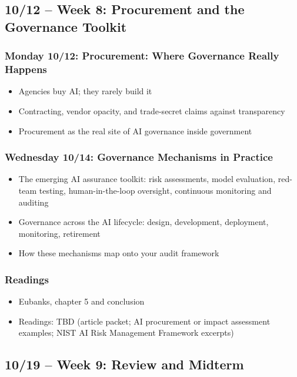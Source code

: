 \documentclass[12pt]{article}
\begin{document}
\subsection*{10/12 -- Week 8: Procurement and the Governance Toolkit}
    \subsubsection*{Monday 10/12: Procurement: Where Governance Really Happens}
        \begin{itemize}
            \item Agencies buy AI; they rarely build it
            \item Contracting, vendor opacity, and trade-secret claims against transparency
            \item Procurement as the real site of AI governance inside government
        \end{itemize}
    \subsubsection*{Wednesday 10/14: Governance Mechanisms in Practice}
        \begin{itemize}
            \item The emerging AI assurance toolkit: risk assessments, model evaluation, red-team testing, human-in-the-loop oversight, continuous monitoring and auditing
            \item Governance across the AI lifecycle: design, development, deployment, monitoring, retirement
            \item How these mechanisms map onto your audit framework
        \end{itemize}
    \subsubsection*{Readings}
        \begin{itemize}
            \item Eubanks, chapter 5 and conclusion
            \item Readings: TBD (article packet; AI procurement or impact assessment examples; NIST AI Risk Management Framework excerpts)
        \end{itemize}

\subsection*{10/19 -- Week 9: Review and Midterm}
\end{document}
